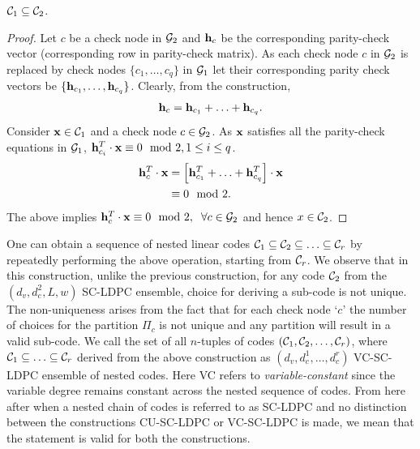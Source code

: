 \begin{lemma}\label{Lemma:NestedCodes}
$ \mathcal{C}_{1} \subseteq \mathcal{C}_{2}$.
\end{lemma}
\begin{proof}
Let $c$ be a check node in $\mathcal{G}_{2}$ and $\mathbf{h}_{c}$ be the  corresponding parity-check vector (corresponding row in parity-check matrix). As each check node $c$ in $\mathcal{G}_{2}$ is replaced by check nodes $\{c_{1},\ldots , c_{q}\}$ in $\mathcal{G}_{1}$ let their corresponding parity check vectors be $\{\mathbf{h}_{c_{1}},\ldots , \mathbf{h}_{c_{q}}\}$. Clearly, from the construction,
\begin{align*}
\mathbf{h}_{c}=\mathbf{h}_{c_{1}}+\ldots +\mathbf{h}_{c_{q}}.
\end{align*}
Consider $\mathbf{x}\in\mathcal{C}_{1}$ and a check node $c\in \mathcal{G}_{2}$. As $\mathbf{x}$ satisfies all the parity-check equations in $\mathcal{G}_{1}$, $\mathbf{h}^{T}_{c_{i}}\cdot \mathbf{x}\equiv 0 \mod 2, 1\leq i \leq q$.
\begin{align*}
\mathbf{h}^{T}_{c}\cdot \mathbf{x}&=\left[\mathbf{h}^{T}_{c_{1}}+\ldots +\mathbf{h}^{T}_{c_{q}}\right] \cdot \mathbf{x}\\
												&\equiv 0 \mod 2. 
\end{align*}
The above implies $\mathbf{h}^{T}_{c}\cdot \mathbf{x}\equiv 0 \mod 2, \hspace{0.2cm} \forall c\in \mathcal{G}_{2}$ and hence $x\in \mathcal{C}_{2}$.
\end{proof}
One can obtain a sequence of nested linear codes $\mathcal{C}_1\subseteq\mathcal{C}_2\subseteq \ldots\subseteq\mathcal{C}_r$ by repeatedly performing the above operation, starting from $\mathcal{C}_{r}$. We observe that in this construction, unlike the previous construction, for any code $\mathcal{C}_{2}$ from the $(d_{v},d_{c}^{2},L,w)$ SC-LDPC ensemble, choice for deriving a sub-code is not unique. The non-uniqueness arises from the fact that for each check node `$c$' the number of choices for the partition $\Pi_{c}$ is not unique and any partition will result in a valid sub-code. We call the set of all $n$-tuples of codes $(\mathcal{C}_{1},\mathcal{C}_{2},\ldots,\mathcal{C}_{r})$, where $\mathcal{C}_{1}\subseteq \ldots\subseteq\mathcal{C}_{r}$ derived from the above construction as $(d_{v},d_{c}^{1},\ldots,d_{c}^{r})$ VC-SC-LDPC ensemble of nested codes. Here VC refers to \textit{variable-constant} since the variable degree remains constant across the nested sequence of codes. From here after when a nested chain of codes is referred to as SC-LDPC and no distinction between the constructions CU-SC-LDPC or VC-SC-LDPC is made, we mean that the statement is valid for both the constructions. 


